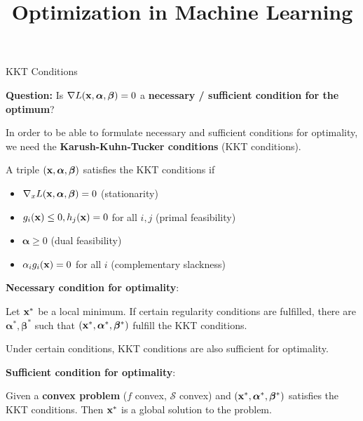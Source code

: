 \documentclass[11pt,compress,t,notes=noshow, xcolor=table]{beamer}
\title{Optimization in Machine Learning}
\date{}
\begin{document}
\sloppy

\begin{vbframe}{KKT Conditions}

\textbf{Question: } Is $\nabla L(\mathbf{x}, \bm{\alpha}, \bm{\beta}) = 0$ a \textbf{necessary / sufficient condition for the optimum}?

\lz

In order to be able to formulate necessary and sufficient conditions for optimality, we need the \textbf{Karush-Kuhn-Tucker conditions} (KKT conditions).

\lz

A triple $(\mathbf{x}, \bm{\alpha}, \bm{\beta})$ satisfies the KKT conditions if

  \begin{itemize}
    \item $\nabla_x L(\mathbf{x}, \bm{\alpha}, \bm{\beta}) = 0$ (stationarity)
    \item $g_i(\mathbf{x}) \le 0, h_j(\mathbf{x}) = 0$ for all $i, j$ (primal feasibility)
    \item $\bm{\alpha} \ge 0$ (dual feasibility)
    \item $\alpha_i g_i(\mathbf{x}) = 0$ for all $i$ (complementary slackness)
  \end{itemize}



  \framebreak


\textbf{Necessary condition for optimality}:

Let $\mathbf{x}^*$ be a local minimum. If certain regularity conditions are fulfilled, there are $\bm{\alpha}^*, \bm{\beta}^*$ such that $(\mathbf{x}^*, \bm{\alpha}^*, \bm{\beta}^*)$ fulfill the KKT conditions.

  \lz

  Under certain conditions, KKT conditions are also sufficient for optimality.

  \lz

  \textbf{Sufficient condition for optimality}:

  Given a \textbf{convex problem} ($f$ convex, $\mathcal{S}$ convex) and $(\mathbf{x}^*, \bm{\alpha}^*, \bm{\beta}^*)$ satisfies the KKT conditions. Then $\mathbf{x}^*$ is a global solution to the problem.





\end{vbframe}
\end{document}
